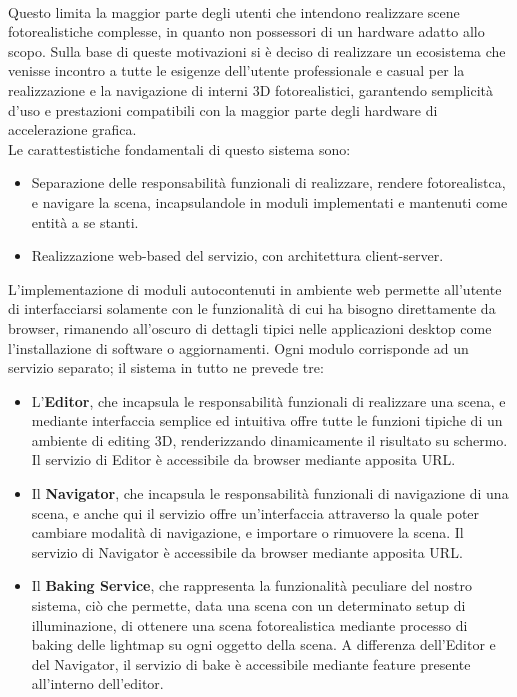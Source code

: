 \\Questo limita la maggior parte degli utenti che intendono realizzare scene fotorealistiche complesse, in quanto non possessori di un hardware adatto allo scopo. Sulla base di queste motivazioni si è deciso di realizzare un ecosistema che venisse incontro a tutte le esigenze dell’utente professionale e casual per la realizzazione e la navigazione di interni 3D fotorealistici, garantendo semplicità d’uso e prestazioni compatibili con la maggior parte degli hardware di accelerazione grafica. 
\\
Le carattestistiche fondamentali di questo sistema sono:
\begin{itemize}
\item Separazione delle responsabilità funzionali di realizzare, rendere fotorealistca, e navigare la scena, incapsulandole in moduli implementati e mantenuti come entità a se stanti.
\item Realizzazione  web-based del servizio, con architettura client-server. 
\end{itemize}
L’implementazione di moduli autocontenuti in ambiente web permette all’utente di interfacciarsi solamente con le funzionalità di cui ha bisogno direttamente da browser, rimanendo all’oscuro di dettagli tipici nelle applicazioni desktop come l’installazione di software o aggiornamenti. Ogni modulo corrisponde ad un servizio separato; il sistema in tutto ne prevede tre:
\begin{itemize}
\item L'\textbf{Editor}, che incapsula le responsabilità funzionali di realizzare una scena, e mediante interfaccia semplice ed intuitiva offre tutte le funzioni tipiche di un ambiente di editing 3D, renderizzando dinamicamente il risultato su schermo. Il servizio di Editor è accessibile da browser mediante apposita URL.
\item Il \textbf{Navigator}, che incapsula le responsabilità funzionali di navigazione di una scena, e anche qui il servizio offre un’interfaccia attraverso la quale poter cambiare modalità di navigazione, e importare o rimuovere la scena. Il servizio di Navigator è accessibile da browser mediante apposita URL.
\item Il \textbf{Baking Service}, che rappresenta la funzionalità peculiare del nostro sistema, ciò che permette, data una scena con un determinato setup di illuminazione, di ottenere una scena fotorealistica mediante processo di baking delle lightmap su ogni oggetto della scena. A differenza dell’Editor e del Navigator, il servizio di bake è accessibile mediante feature presente all’interno dell’editor.
\end{itemize}
